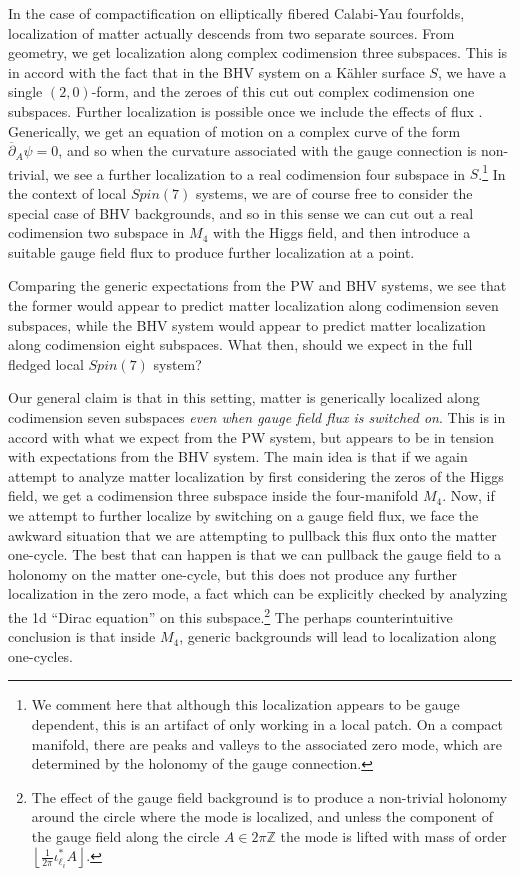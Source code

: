 \documentclass[12pt]{article}%
\numberwithin{equation}{section}
\renewcommand{\(}{\left(}
\renewcommand{\)}{\right)}
\renewcommand{\[}{\left[}
\renewcommand{\]}{\right]}
\begin{document}
In the case of compactification on elliptically fibered Calabi-Yau fourfolds, localization of matter actually descends from two separate sources. From geometry, we get localization along complex codimension three subspaces. This is in accord with the fact that in the BHV system on a K\"ahler surface $S$, we have a single $(2,0)$-form, and the zeroes of this cut out complex codimension one subspaces. Further localization is possible once we include the effects of flux \cite{Beasley:2008dc, Beasley:2008kw, Heckman:2008qa, Font:2012wq, Font:2013ida}. Generically, we get an equation of motion on a complex curve of the form $\overline{\partial}_{A} \psi = 0$, and so when the curvature associated with the gauge connection is non-trivial, we see a further localization to a real codimension four subspace in $S$.\footnote{We comment here that although this localization appears to be gauge dependent, this is an artifact of only working in a local patch. On a compact manifold, there are peaks and valleys to the associated zero mode, which are determined by the holonomy of the gauge connection.} In the context of local $Spin(7)$ systems, we are of course free to consider the special case of BHV backgrounds, and so in this sense we can cut out a real codimension two subspace in $M_4$ with the Higgs field, and then introduce a suitable gauge field flux to produce further localization at a point.

Comparing the generic expectations from the PW and BHV systems, we see that the former would appear to predict matter localization along codimension seven subspaces, while the BHV system would appear to predict matter localization along codimension eight subspaces. What then, should we expect in the full fledged local $Spin(7)$ system?

Our general claim is that in this setting, matter is generically localized along codimension seven subspaces \textit{even when gauge field flux is switched on}. This is in accord with what we expect from the PW system, but appears to be in tension with expectations from the BHV system. The main idea is that if we again attempt to analyze matter localization by first considering the zeros of the Higgs field, we get a codimension three subspace inside the four-manifold $M_4$. Now, if we attempt to further localize by switching on a gauge field flux, we face the awkward situation that we are attempting to pullback this flux onto the matter one-cycle. The best that can happen is that we can pullback the gauge field to a holonomy on the matter one-cycle, but this does not produce any further localization in the zero mode, a fact which can be explicitly checked by analyzing the 1d ``Dirac equation'' on this subspace.\footnote{The effect of the gauge field background is to produce a non-trivial holonomy around the circle where the mode is localized, and unless the component of the gauge field along the circle $A\in 2 \pi \mathbb Z$ the mode is lifted with mass of order $\left \lfloor{\frac{1}{2\pi}\iota^*_{\ell_i}A} \right \rfloor$.} The perhaps counterintuitive conclusion is that inside $M_4$, generic backgrounds will lead to localization along one-cycles.
\end{document}
